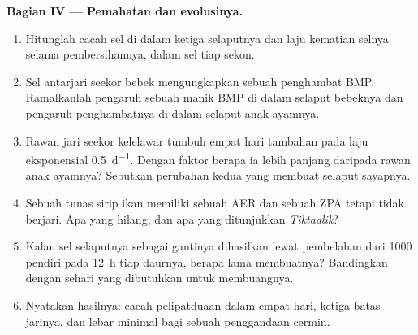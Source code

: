 \begin{problem}
\medskip
\noindent\textbf{Bagian IV --- Pemahatan dan evolusinya.}
\begin{enumerate}[resume]
  \item Hitunglah cacah sel di dalam ketiga selaputnya dan laju
        kematian selnya selama pembersihannya, dalam sel tiap sekon.
  \item Sel antarjari seekor bebek mengungkapkan sebuah penghambat BMP.
        Ramalkanlah pengaruh sebuah manik BMP di dalam selaput bebeknya
        dan pengaruh penghambatnya di dalam selaput anak ayamnya.
  \item Rawan jari seekor kelelawar tumbuh empat hari tambahan pada
        laju eksponensial \qty{0.5}{d^{-1}}. Dengan faktor berapa ia
        lebih panjang daripada rawan anak ayamnya? Sebutkan perubahan
        kedua yang membuat selaput sayapnya.
  \item Sebuah tunas sirip ikan memiliki sebuah AER dan sebuah ZPA
        tetapi tidak berjari. Apa yang hilang, dan apa yang ditunjukkan
        \emph{Tiktaalik}?
  \item Kalau sel selaputnya sebagai gantinya dihasilkan lewat
        pembelahan dari \num{1000} pendiri pada \qty{12}{h} tiap
        daurnya, berapa lama membuatnya? Bandingkan dengan sehari yang
        dibutuhkan untuk membuangnya.
  \item Nyatakan hasilnya: cacah pelipatduaan dalam empat hari, ketiga
        batas jarinya, dan lebar minimal bagi sebuah penggandaan cermin.
\end{enumerate}
\end{problem}
